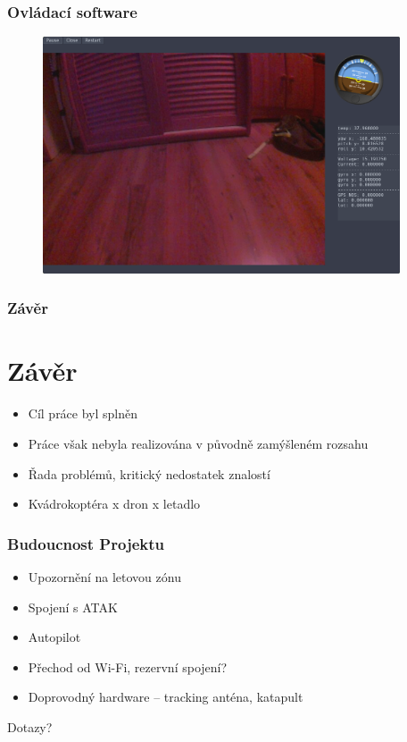 \documentclass[aspectratio=43]{beamer}
\begin{document}
\begin{frame}[fragile]
	\frametitle{Ovládací software}
	\begin{figure}[h]
		\centering
		\includegraphics[height=7cm]{./../img/interface.png}
	\end{figure}
\end{frame}


\begin{frame}[fragile]
	\frametitle{Závěr}
	\section{Závěr}
	\begin{itemize}
		\item Cíl práce byl splněn
		\item Práce však nebyla realizována v původně zamýšleném rozsahu
		\item Řada problémů, kritický nedostatek znalostí
		\item Kvádrokoptéra x dron x letadlo
	\end{itemize}
\end{frame}

\begin{frame}[fragile]
	\frametitle{Budoucnost Projektu}
	\begin{itemize}
		\item Upozornění na letovou zónu
		\item Spojení s ATAK
		\item Autopilot
		\item Přechod od Wi-Fi, rezervní spojení?
		\item Doprovodný hardware -- tracking anténa, katapult
	\end{itemize}
\end{frame}

\appendix
\begin{frame}[plain]
	\centering
	\Huge Dotazy?
\end{frame}
\end{document}
